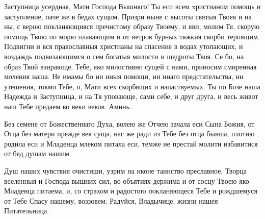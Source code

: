 

Заступница усердная, Мати Господа Вышняго! Ты еси всем xристианом помощь и заступление, паче же в бедах сущим. Призри ныне с высоты святыя Твоея и на ны, с верою покланяющияся пречистому образу Твоему, и яви, молим Тя, скорую помощь Твою по морю плавающим и от ветров бурных тяжкия скорби терпящим. Подвигни и вся православныя христианы на спасение в водах утопающих, и воздаждь подвизающимся о сем богатыя милости и щедроты Твоя. Се бо, на образ Твой взирающе, Тебе, яко милостивно сущей с нами, приносим смиренная моления наша. Не имамы бо ни иныя помощи, ни инаго предстательства, ни утешения, токмо Тебе, о, Мати всех скорбящих и напаствуемых. Ты по Бозе наша Надежда и Заступница, и на Тя уповающе, сами себе, и друг друга, и весь живот наш Тебе предаем во веки веков. Аминь.
\mychapterending

 



Без семене от Божественнаго Духа, волею же Отчею зачала еси Сына Божия, от Отца без матери прежде век суща, нас же ради из Тебе без отца бывша, плотию родила еси и Младенца млеком питала еси, темже не престай молити избавитися от бед душам нашим.




Душ наших чувствия очистиши, узрим на иконе таинство преславное, Творца вселенныя и Господа вышних сил, во объятиях держима и от сосцу Твоею яко Младенца питаема, и, со страхом и радостию покланяющеся Тебе и рождшемуся от Тебе Спасу нашему, воззовем: Радуйся, Владычице, жизни нашея Питательница.




